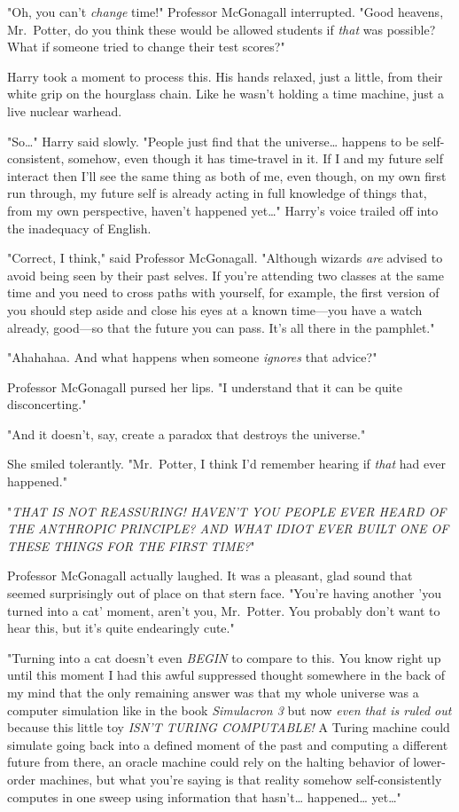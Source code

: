 "Oh, you can't \emph{change} time!" Professor McGonagall interrupted. "Good 
heavens, Mr.~Potter, do you think these would be allowed students if 
\emph{that} was possible? What if someone tried to change their test scores?"

Harry took a moment to process this. His hands relaxed, just a little, from 
their white grip on the hourglass chain. Like he wasn't holding a time machine, 
just a live nuclear warhead.

"So{\ldots}" Harry said slowly. "People just find that the universe{\ldots} 
happens to be self-consistent, somehow, even though it has time-travel in it. 
If I and my future self interact then I'll see the same thing as both of me, 
even though, on my own first run through, my future self is already acting in 
full knowledge of things that, from my own perspective, haven't happened 
yet{\ldots}" Harry's voice trailed off into the inadequacy of English.

"Correct, I think," said Professor McGonagall. "Although wizards \emph{are} 
advised to avoid being seen by their past selves. If you're attending two 
classes at the same time and you need to cross paths with yourself, for 
example, the first version of you should step aside and close his eyes at a 
known time---you have a watch already, good---so that the future you can pass. 
It's all there in the pamphlet."

"Ahahahaa. And what happens when someone \emph{ignores} that advice?"

Professor McGonagall pursed her lips. "I understand that it can be quite 
disconcerting."

"And it doesn't, say, create a paradox that destroys the universe."

She smiled tolerantly. "Mr.~Potter, I think I'd remember hearing if \emph{that} 
had ever happened."

"\emph{THAT IS NOT REASSURING! HAVEN'T YOU PEOPLE EVER HEARD OF THE ANTHROPIC 
PRINCIPLE? AND WHAT IDIOT EVER BUILT ONE OF THESE THINGS FOR THE FIRST TIME?}"

Professor McGonagall actually laughed. It was a pleasant, glad sound that 
seemed surprisingly out of place on that stern face. "You're having another 
'you turned into a cat' moment, aren't you, Mr.~Potter. You probably don't want 
to hear this, but it's quite endearingly cute."

"Turning into a cat doesn't even \emph{BEGIN} to compare to this. You know 
right up until this moment I had this awful suppressed thought somewhere in the 
back of my mind that the only remaining answer was that my whole universe was a 
computer simulation like in the book \emph{Simulacron 3} but now \emph{even 
that is ruled out} because this little toy \emph{ISN'T TURING COMPUTABLE!} A 
Turing machine could simulate going back into a defined moment of the past and 
computing a different future from there, an oracle machine could rely on the 
halting behavior of lower-order machines, but what you're saying is that 
reality somehow self-consistently computes in one sweep using information that 
hasn't{\ldots} happened{\ldots} yet{\ldots}"

